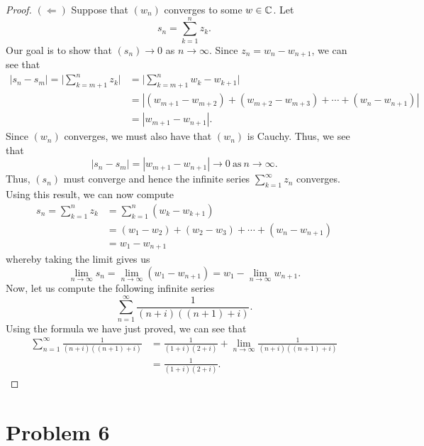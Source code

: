 \documentclass[a4paper]{article}
\begin{document}
\begin{proof}
\( (\Leftarrow) \) Suppose that \( ({w}_{n}) \) converges to some \( w \in \mathbb{C}  \). Let
\[  {s}_{n} = \sum_{ k=1  }^{ n } {z}_{k}. \]
Our goal is to show that \( ({s}_{n}) \to 0  \) as \( n \to \infty  \). Since \( {z}_{n} = {w}_{n} - {w}_{n+1} \), we can see that      
\begin{align*}
    | {s}_{n} - {s}_{m} | = \Big| \sum_{ k=m+1  }^{ n } {z}_{k}  \Big| &= \Big| \sum_{ k=m+1  }^{ n } {w}_{k} - {w}_{k+1} \Big|   \\
                &= | ({w}_{m+1} - {w}_{m+2}) + ({w}_{m+2} - {w}_{m+3}) + \cdots + ({w}_{n} - {w}_{n+1}) | \\
                &= | {w}_{m+1} - {w}_{n+1} |.
\end{align*}
Since \( ({w}_{n})  \) converges, we must also have that \( ({w}_{n}) \) is Cauchy. Thus, we see that 
\[  | {s}_{n} - {s}_{m} | = | {w}_{m+1} - {w}_{n+1}  |  \to 0 \ \text{as} \ n  \to \infty.   \]
Thus, \( ({s}_{n}) \) must converge and hence the infinite series \( \sum_{ k=1  }^{ \infty  } {z}_{n}  \) converges. Using this result, we can now compute
\begin{align*}
    {s}_{n} = \sum_{ k=1  }^{ n } {z}_{k} &= \sum_{ k=1  }^{ n } ({w}_{k} - {w}_{k+1})  \\
                                          &=  ({w}_{1} - {w}_{2}) + ({w}_{2} - {w}_{3}) + \cdots + ({w}_{n} - {w}_{n+1}) \\
                                          &= {w}_{1} - {w}_{n+1}
\end{align*}
whereby taking the limit gives us
\[  \lim_{ n \to \infty  }  {s}_{n} = \lim_{ n \to \infty  }  ({w}_{1} - {w}_{n+1}) = {w}_{1} - \lim_{ n \to \infty  }  {w}_{n+1}. \]
Now, let us compute the following infinite series
\[  \sum_{ n=1  }^{  \infty  } \frac{ 1 }{ (n+i)((n+1)+i) }.  \]
Using the formula we have just proved, we can see that
\begin{align*}
\sum_{ n=1 }^{ \infty  } \frac{ 1  }{  (n+i)((n+1)+i) }  &= \frac{ 1 }{ (1+i) (2 + i) }  + \lim_{ n \to \infty  }  \frac{ 1 }{ (n+i)((n+1) + i) }   \\
                                                         &= \frac{ 1 }{ (1+i) (2+i) }.
\end{align*}
\end{proof}

\section*{Problem 6}
\end{document}
